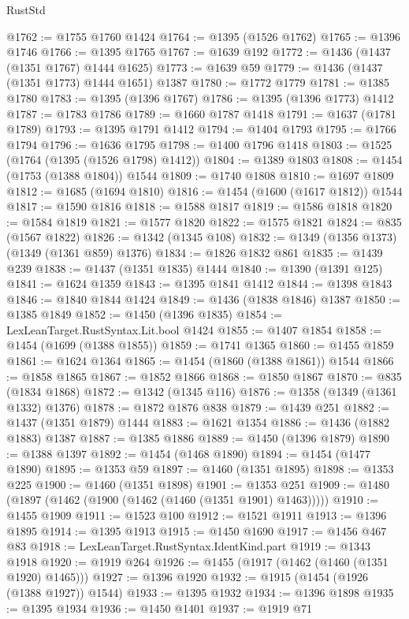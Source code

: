 \begin{lexlean}{RustStd}
\begin{coremodule}
{\begin{coremodule}
{{{{{{{{{{@1762 := @1755 @1760 @1424
@1764 := @1395 (@1526 @1762)
@1765 := @1396 @1746
@1766 := @1395 @1765
@1767 := @1639 @192
@1772 := @1436 (@1437 (@1351 @1767) @1444 @1625)
@1773 := @1639 @59
@1779 := @1436 (@1437 (@1351 @1773) @1444 @1651) @1387
@1780 := @1772 @1779
@1781 := @1385 @1780
@1783 := @1395 (@1396 @1767)
@1786 := @1395 (@1396 @1773) @1412
@1787 := @1783 @1786
@1789 := @1660 @1787 @1418
@1791 := @1637 (@1781 @1789)
@1793 := @1395 @1791 @1412
@1794 := @1404 @1793
@1795 := @1766 @1794
@1796 := @1636 @1795
@1798 := @1400 @1796 @1418
@1803 := @1525 (@1764 (@1395 (@1526 @1798) @1412))
@1804 := @1389 @1803
@1808 := @1454 (@1753 (@1388 @1804)) @1544
@1809 := @1740 @1808
@1810 := @1697 @1809
@1812 := @1685 (@1694 @1810)
@1816 := @1454 (@1600 (@1617 @1812)) @1544
@1817 := @1590 @1816
@1818 := @1588 @1817
@1819 := @1586 @1818
@1820 := @1584 @1819
@1821 := @1577 @1820
@1822 := @1575 @1821
@1824 := @835 (@1567 @1822)
@1826 := @1342 (@1345 @108)
@1832 := @1349 (@1356 @1373) (@1349 (@1361 @859) @1376)
@1834 := @1826 @1832 @861
@1835 := @1439 @239
@1838 := @1437 (@1351 @1835) @1444
@1840 := @1390 (@1391 @125)
@1841 := @1624 @1359
@1843 := @1395 @1841 @1412
@1844 := @1398 @1843
@1846 := @1840 @1844 @1424
@1849 := @1436 (@1838 @1846) @1387
@1850 := @1385 @1849
@1852 := @1450 (@1396 @1835)
@1854 := LexLeanTarget.RustSyntax.Lit.bool @1424
@1855 := @1407 @1854
@1858 := @1454 (@1699 (@1388 @1855))
@1859 := @1741 @1365
@1860 := @1455 @1859
@1861 := @1624 @1364
@1865 := @1454 (@1860 (@1388 @1861)) @1544
@1866 := @1858 @1865
@1867 := @1852 @1866
@1868 := @1850 @1867
@1870 := @835 (@1834 @1868)
@1872 := @1342 (@1345 @116)
@1876 := @1358 (@1349 (@1361 @1332) @1376)
@1878 := @1872 @1876 @838
@1879 := @1439 @251
@1882 := @1437 (@1351 @1879) @1444
@1883 := @1621 @1354
@1886 := @1436 (@1882 @1883) @1387
@1887 := @1385 @1886
@1889 := @1450 (@1396 @1879)
@1890 := @1388 @1397
@1892 := @1454 (@1468 @1890)
@1894 := @1454 (@1477 @1890)
@1895 := @1353 @59
@1897 := @1460 (@1351 @1895)
@1898 := @1353 @225
@1900 := @1460 (@1351 @1898)
@1901 := @1353 @251
@1909 := @1480 (@1897 (@1462 (@1900 (@1462 (@1460 (@1351 @1901) @1463)))))
@1910 := @1455 @1909
@1911 := @1523 @100
@1912 := @1521 @1911
@1913 := @1396 @1895
@1914 := @1395 @1913
@1915 := @1450 @1690
@1917 := @1456 @467 @83
@1918 := LexLeanTarget.RustSyntax.IdentKind.part
@1919 := @1343 @1918
@1920 := @1919 @264
@1926 := @1455 (@1917 (@1462 (@1460 (@1351 @1920) @1465)))
@1927 := @1396 @1920
@1932 := @1915 (@1454 (@1926 (@1388 @1927)) @1544)
@1933 := @1395 @1932
@1934 := @1396 @1898
@1935 := @1395 @1934
@1936 := @1450 @1401
@1937 := @1919 @71
}}}}}}}}}}
\end{coremodule}}
\end{coremodule}
\end{lexlean}
